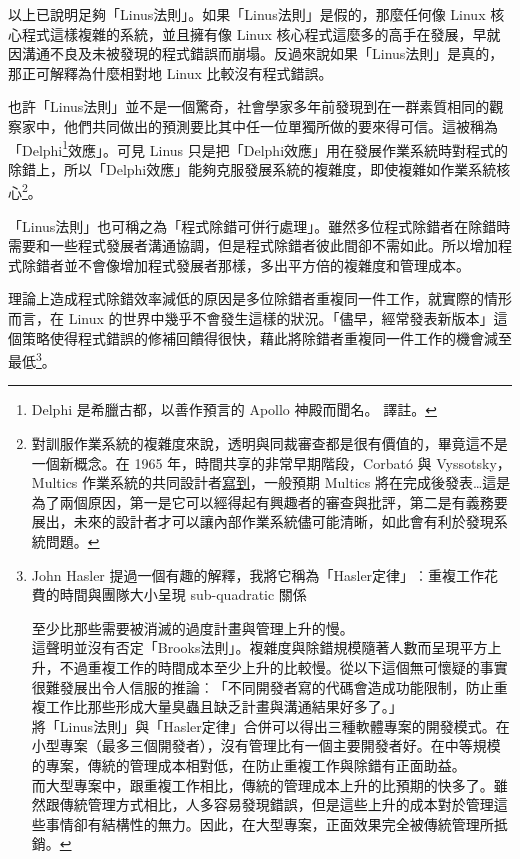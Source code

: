 \documentclass[12pt,]{article}
\makeatletter
\newcommand*{\shifttext}[2]{%
  \settowidth{\@tempdima}{#2}%
  \makebox[\@tempdima]{\hspace*{#1}#2}%
}
\makeatother
\begin{document}
以上已說明足夠「Linus法則」。如果「Linus法則」是假的，那麼任何像 Linux
核心程式這樣複雜的系統，並且擁有像 Linux
核心程式這麼多的高手在發展，早就因溝通不良及未被發現的程式錯誤而崩塌。反過來說如果「Linus法則」是真的，那正可解釋為什麼相對地
Linux 比較沒有程式錯誤。

也許「Linus法則」並不是一個驚奇，社會學家多年前發現到在一群素質相同的觀察家中，他們共同做出的預測要比其中任一位單獨所做的要來得可信。這被稱為「Delphi\footnote{Delphi
  是希臘古都，以善作預言的 Apollo 神殿而聞名。 \shifttext{1pt}{---}\shifttext{-1pt}{---} 譯註。}效應」。可見
Linus
只是把「Delphi效應」用在發展作業系統時對程式的除錯上，所以「Delphi效應」能夠克服發展系統的複雜度，即使複雜如作業系統核心\footnote{對訓服作業系統的複雜度來說，透明與同裁審查都是很有價值的，畢竟這不是一個新概念。在
  1965 年，時間共享的非常早期階段，Corbató 與 Vyssotsky，Multics
  作業系統的共同設計者\href{http://www.multicians.org/fjcc1.html}{寫到}，一般預期
  Multics
  將在完成後發表\ldots{}這是為了兩個原因，第一是它可以經得起有興趣者的審查與批評，第二是有義務要展出，未來的設計者才可以讓內部作業系統儘可能清晰，如此會有利於發現系統問題。}。

「Linus法則」也可稱之為「程式除錯可併行處理」。雖然多位程式除錯者在除錯時需要和一些程式發展者溝通協調，但是程式除錯者彼此間卻不需如此。所以增加程式除錯者並不會像增加程式發展者那樣，多出平方倍的複雜度和管理成本。

理論上造成程式除錯效率減低的原因是多位除錯者重複同一件工作，就實際的情形而言，在
Linux
的世界中幾乎不會發生這樣的狀況。「儘早，經常發表新版本」這個策略使得程式錯誤的修補回饋得很快，藉此將除錯者重複同一件工作的機會減至最低\footnote{John
  Hasler
  提過一個有趣的解釋，我將它稱為「Hasler定律」︰重複工作花費的時間與團隊大小呈現
  sub-quadratic 關係 \shifttext{1pt}{---}\shifttext{-1pt}{---}
  至少比那些需要被消滅的過度計畫與管理上升的慢。\\這聲明並沒有否定「Brooks法則」。複雜度與除錯規模隨著人數而呈現平方上升，不過重複工作的時間成本至少上升的比較慢。從以下這個無可懷疑的事實很難發展出令人信服的推論︰「不同開發者寫的代碼會造成功能限制，防止重複工作比那些形成大量臭蟲且缺乏計畫與溝通結果好多了。」\\將「Linus法則」與「Hasler定律」合併可以得出三種軟體專案的開發模式。在小型專案（最多三個開發者），沒有管理比有一個主要開發者好。在中等規模的專案，傳統的管理成本相對低，在防止重複工作與除錯有正面助益。\\而大型專案中，跟重複工作相比，傳統的管理成本上升的比預期的快多了。雖然跟傳統管理方式相比，人多容易發現錯誤，但是這些上升的成本對於管理這些事情卻有結構性的無力。因此，在大型專案，正面效果完全被傳統管理所抵銷。}。
\end{document}
